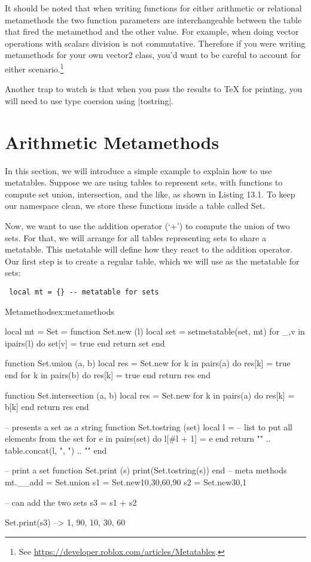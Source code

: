 It should be noted that when writing functions for either arithmetic or relational metamethods the two function parameters are interchangeable between the table that fired the metamethod and the other value. For example, when doing vector operations with scalars division is not commutative. Therefore if you were writing metamethods for your own vector2 class, you’d want to be careful to account for either scenario.\footnote{See \protect\url{https://developer.roblox.com/articles/Metatables}.}

Another trap to watch is that when you pass the results to TeX for printing, you will need to use type coersion
using |tostring|. 

\section{Arithmetic Metamethods}

In this section, we will introduce a simple example to explain how to use metatables.
Suppose we are using tables to represent sets, with functions to compute
set union, intersection, and the like, as shown in Listing 13.1. To keep our
namespace clean, we store these functions inside a table called Set.

Now, we want to use the addition operator (‘+’) to compute the union of
two sets. For that, we will arrange for all tables representing sets to share a
metatable. This metatable will define how they react to the addition operator.
Our first step is to create a regular table, which we will use as the metatable for
sets:

\begin{verbatim}
 local mt = {} -- metatable for sets
\end{verbatim}

\begin{texexample}{Metamethods}{ex:metamethods}
\begin{luacode}
local mt = {}
Set = {}
function Set.new (l)
   local set = {}
   setmetatable(set, mt)
   for _,v in ipairs(l) do set[v] = true end
   return set
end

function Set.union (a, b)
  local res = Set.new{}
  for k in pairs(a) do res[k] = true end
  for k in pairs(b) do res[k] = true end
  return res
end

function Set.intersection (a, b)
  local res = Set.new{}
  for k in pairs(a) do
  res[k] = b[k]
  end
  return res
end

-- presents a set as a string
function Set.tostring (set)
local l = {} -- list to put all elements from the set
for e in pairs(set) do
l[#l + 1] = e
end
return "{" .. table.concat(l, ", ") .. "}"
end

-- print a set
function Set.print (s)
  print(Set.tostring(s))
end
-- meta methods 
mt.__add = Set.union
s1 = Set.new{10,30,60,90}
s2 = Set.new{30,1}

-- can add the two sets
s3 = s1 + s2

Set.print(s3) --> {1, 90, 10, 30, 60}
\end{luacode}
\end{texexample}

